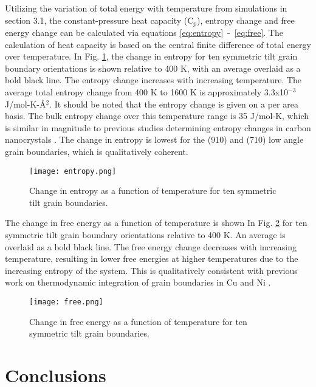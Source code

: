 \documentclass[review]{elsarticle}
\begin{document}
Utilizing the variation of total energy with temperature from simulations in section 3.1, the constant-pressure heat capacity (C$_{p}$), entropy change and free energy change can be calculated via equations \ref{eq:entropy}~-~\ref{eq:free}. The calculation of heat capacity is based on the central finite difference of total energy over temperature. In Fig. \ref{fig:entropy}, the change in entropy for ten symmetric tilt grain boundary orientations is shown relative to 400 K, with an average overlaid as a bold black line. The entropy change increases with increasing temperature. The average total entropy change from 400 K to 1600 K is approximately 3.3x10$^{-3}$ J/mol-K-{\AA}$^{2}$. It should be noted that the entropy change is given on a per area basis. The bulk entropy change over this temperature range is 35 J/mol-K, which is similar in magnitude to previous studies determining entropy changes in carbon nanocrystals \cite{mcnutt2014}. The change in entropy is lowest for the (910) and (710) low angle grain boundaries, which is qualitatively coherent.

\begin{figure}[h]
 \centering
 \texttt{[image: entropy.png]} 
 \caption{Change in entropy as a function of temperature for ten symmetric tilt grain boundaries.}
 \label{fig:entropy}
\end{figure}

The change in free energy as a function of temperature is shown In Fig. \ref{fig:free} for ten symmetric tilt grain boundary orientations relative to 400 K. An average is overlaid as a bold black line. The free energy change decreases with increasing temperature, resulting in lower free energies at higher temperatures due to the increasing entropy of the system. This is qualitatively consistent with previous work on thermodynamic integration of grain boundaries in Cu \cite{frolov2012} and Ni \cite{foiles2010}. 

\begin{figure}[h]
 \centering
 \texttt{[image: free.png]} 
 \caption{Change in free energy as a function of temperature for ten symmetric tilt grain boundaries.}
 \label{fig:free}
\end{figure}

\FloatBarrier

\section{Conclusions}
\end{document}
